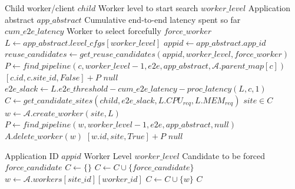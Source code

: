 \begin{algorithm}
\caption{$find\_pipeline$}
\begin{algorithmic}[1]
\Require Child worker/client $child$
\Require Worker level to start search $worker\_level$
\Require Application abstract $app\_abstract$
\Require Cumulative end-to-end latency spent so far $cum\_e2e\_latency$
\Require Worker to select forcefully $force\_worker$
 
    \State \Return []
\EndIf
\State $L \gets app\_abstract.level\_cfgs [worker\_level]$
\State $appid \gets app\_abstract.app\_id$
\State $reuse\_candidates \gets get\_reuse\_candidates \left( appid, worker\_level,  force\_worker \right)$
            \State $P \gets find\_pipeline \left( c, worker\_level - 1, e2e, app\_abstract, \mathcal{A}.parent\_map[c] \right)$
                \State \Return $[c.id, c.site\_id, False] + P$
            \EndIf
        \EndIf
    \EndIf
\EndFor
{}
    \State \Return $null$
\EndIf
\State $e2e\_slack \gets L.e2e\_threshold - cum\_e2e\_latency - proc\_latency \left( L, c, 1 \right)$
\State $C \gets get\_candidate\_sites \left( child, e2e\_slack, L.CPU_{req}, L.MEM_{req} \right)$
\For $site \in C$
    \State $w \gets \mathcal{A}.create\_worker \left( site, L\right)$
    \State $P \gets find\_pipeline \left( w, worker\_level - 1, e2e, app\_abstract, null\right)$
        \State $A.delete\_worker \left( w \right)$
    \Else
        \State \Return $[w.id, site, True] + P$
    \EndIf
\EndFor
\State \Return $null$
\end{algorithmic}
\end{algorithm}

\begin{algorithm}
\caption{$get\_reuse\_candidates$}
\label{algo:get_reuse_candidates}
\begin{algorithmic}[1]
\Require Application ID $appid$
\Require Worker Level $worker\_level$
\Require Candidate to be forced $force\_candidate$
\State $C \gets \{\}$
    \State $C \gets C \cup \{ force\_candidate \}$
\Else
            \State $w \gets \mathcal{A}.workers[site\_id][worker\_id]$
                \State $C \gets C \cup \{ w \}$
            \EndIf
        \EndFor
    \EndFor
\EndIf
\State \Return $C$
\end{algorithmic}
\end{algorithm}

